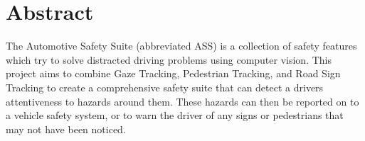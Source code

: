 \section*{Abstract}

The Automotive Safety Suite (abbreviated ASS) is a collection of safety features which try to solve distracted driving problems using computer vision. This project aims to combine Gaze Tracking, Pedestrian Tracking, and Road Sign Tracking to create a comprehensive safety suite that can detect a drivers attentiveness to hazards around them. These hazards can then be reported on to a vehicle safety system, or to warn the driver of any signs or pedestrians that may not have been noticed.